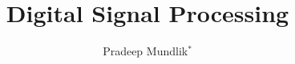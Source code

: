 \documentclass[journal,12pt,twocolumn]{IEEEtran}
\begin{document}
\makeatletter
{}
\makeatother
\let\StandardTheFigure\thefigure
\renewcommand{\thefigure}{\theproblem}
\def\putbox#1#2#3{\makebox[0in][l]{\makebox[#1][l]{}\raisebox{\baselineskip}[0in][0in]{\raisebox{#2}[0in][0in]{#3}}}}
     \def\rightbox#1{\makebox[0in][r]{#1}}
     \def\centbox#1{\makebox[0in]{#1}}
     \def\topbox#1{\raisebox{-\baselineskip}[0in][0in]{#1}}
     \def\midbox#1{\raisebox{-0.5\baselineskip}[0in][0in]{#1}}
\vspace{3cm}
\title{ 
Digital Signal Processing
}
%
%
%
\author{ Pradeep Mundlik$^{*}$ %
}
% 
%
\end{document}
